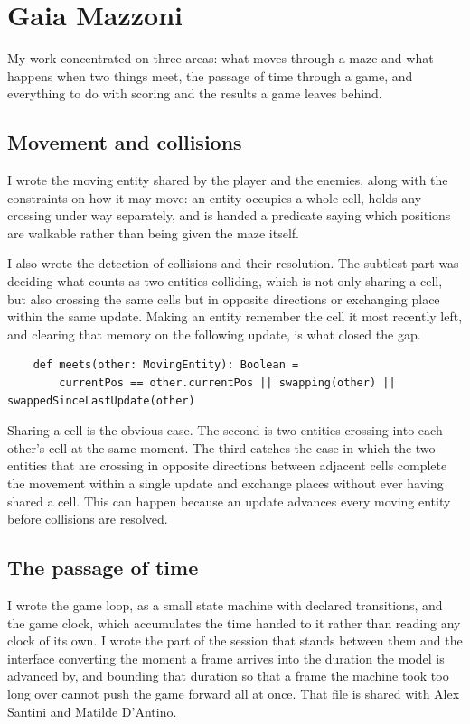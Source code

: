 \section{Gaia Mazzoni}

My work concentrated on three areas: what moves through a maze and what happens when two things meet, the passage of
time through a game, and everything to do with scoring and the results a game leaves behind.

\subsection{Movement and collisions}

I wrote the moving entity shared by the player and the enemies, along with the constraints on how it may move: an
entity occupies a whole cell, holds any crossing under way separately, and is handed a predicate saying which positions
are walkable rather than being given the maze itself.

I also wrote the detection of collisions and their resolution. The subtlest part was deciding what counts as two
entities colliding, which is not only sharing a cell, but also crossing the same cells but in opposite directions
or exchanging place within the same update. Making an entity remember the cell it most recently left, and clearing
that memory on the following update, is what closed the gap.

\begin{lstlisting}
    def meets(other: MovingEntity): Boolean =
        currentPos == other.currentPos || swapping(other) || swappedSinceLastUpdate(other)
\end{lstlisting}

Sharing a cell is the obvious case. The second is two entities crossing into each other's cell at the same moment.
The third catches the case in which the two entities that are crossing in opposite directions between adjacent cells
complete the movement within a single update and exchange places without ever having shared a cell. This can happen
because an update advances every moving entity before collisions are resolved.


\subsection{The passage of time}

I wrote the game loop, as a small state machine with declared transitions, and the game clock, which accumulates the
time handed to it rather than reading any clock of its own. I wrote the part of the session that stands between them and
the interface converting the moment a frame arrives into the duration the model is advanced by, and bounding that
duration so that a frame the machine took too long over cannot push the game forward all at once. That file is shared
with Alex Santini and Matilde D'Antino.

